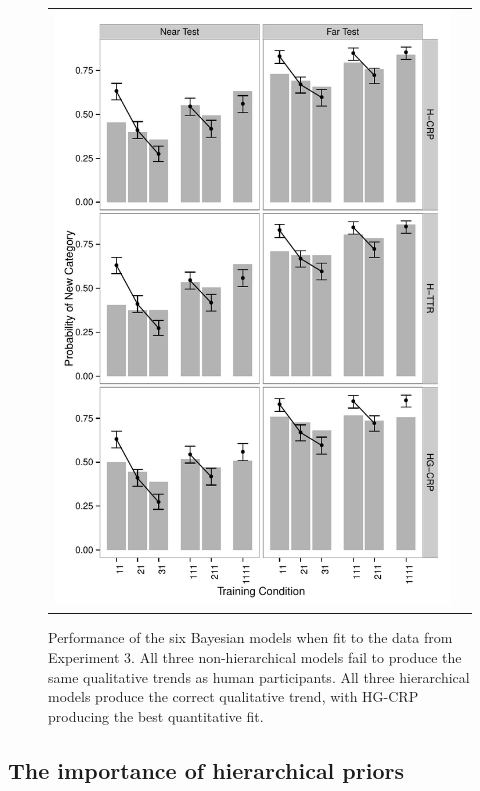 \documentclass[doc]{apa6}
\begin{document}
\begin{figure}[t]
\begin{center}
\begin{tabular}{cc}
\includegraphics[scale=.5]{fit3_hierarchical.pdf}
\end{tabular}
\caption{Performance of the six Bayesian models when fit to the data from Experiment 3. All three non-hierarchical models fail to produce the same qualitative trends as human participants. All three hierarchical models produce the correct qualitative trend, with HG-CRP producing the best quantitative fit.}
\label{fig:exp3}
\end{center}
\end{figure}



\subsection{The importance of hierarchical priors}
\end{document}
